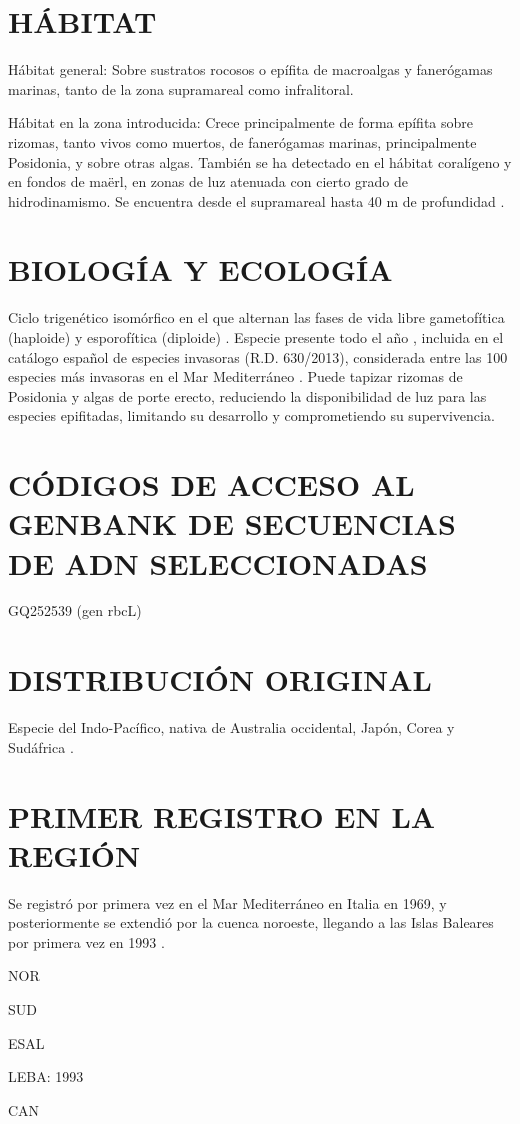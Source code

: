 \documentclass{article}
\begin{document}
\section*{HÁBITAT} 
{\color{olive}Hábitat general}: Sobre sustratos rocosos o epífita de macroalgas y fanerógamas marinas, tanto de la zona supramareal como infralitoral.
\par
{\color{olive}Hábitat en la zona introducida}: Crece principalmente de forma epífita sobre rizomas, tanto vivos como muertos, de fanerógamas marinas, principalmente Posidonia, y sobre otras algas. También se ha detectado en el hábitat coralígeno y en fondos de maërl, en zonas de luz atenuada con cierto grado de hidrodinamismo. Se encuentra desde el supramareal hasta 40 m de profundidad \cite{acro3,acro5}.

\section*{BIOLOGÍA Y ECOLOGÍA}
Ciclo trigenético isomórfico en el que alternan las fases de vida libre gametofítica (haploide) y esporofítica (diploide) \cite{acro7}. Especie presente todo el año \cite{acro4}, incluida en el catálogo español de especies invasoras (R.D. 630/2013)\cite{acro8}, considerada entre las 100 especies más invasoras en el Mar Mediterráneo \cite{acro9}. Puede tapizar rizomas de Posidonia y algas de porte erecto, reduciendo la disponibilidad de luz para las especies epifitadas, limitando su desarrollo y comprometiendo su supervivencia.

\section*{CÓDIGOS DE ACCESO AL GENBANK DE SECUENCIAS DE ADN SELECCIONADAS} 
GQ252539 (gen rbcL) \cite{acro10}
\section*{DISTRIBUCIÓN ORIGINAL}
Especie del Indo-Pacífico, nativa de Australia occidental, Japón, Corea y Sudáfrica \cite{acro2}. 
\section*{PRIMER REGISTRO EN LA REGIÓN}
Se registró por primera vez en el Mar Mediterráneo en Italia en 1969, y posteriormente se extendió por la cuenca noroeste, llegando a las Islas Baleares por primera vez en 1993 \cite{acro3,acro5}.
\par
{\color{olive}NOR}
\par
{\color{olive}SUD}
\par
{\color{olive}ESAL}
\par
{\color{olive}LEBA}: 1993 \cite{acro3}
\par
{\color{olive}CAN}
\par
\end{document}
